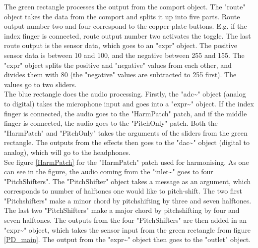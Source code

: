 The green rectangle processes the output from the comport object. The "route" object takes the data from the comport and splits it up into five parts. 
Route output number two and four correspond to the copper-plate buttons. E.g. if the index finger is connected, route output number two activates the toggle. 
The last route output is the sensor data, which goes to an "expr" object. The positive sensor data is between 10 and 100, and the negative between 255 and 155. 
The "expr" object splits the positive and "negative" values from each other, and divides them with 80 (the "negative" values are subtracted to 255 first). 
The values go to two sliders.\\

The blue rectangle does the audio processing. Firstly, the "adc\textasciitilde" object (analog to digital) takes the microphone input and goes into a "expr\textasciitilde" object. If the index finger is connected, 
the audio goes to the "HarmPatch" patch, and if the middle finger is connected, the audio goes to the "PitchOnly" patch. Both the "HarmPatch" and "PitchOnly" takes 
the arguments of the sliders from the green rectangle. The outputs from the effects then goes to the "dac\textasciitilde" object (digital to analog), which will go to the headphones.\\

See figure \ref{HarmPatch} for the "HarmPatch" patch used for harmonising. As one can see in the figure, the audio coming from the "inlet\textasciitilde" goes to four "PitchShifters". The "PitchShifter" object
takes a message as an argument, which corresponds to number of halftones one would like to pitch-shift. The two first "Pitchshifters" make a minor chord by pitchshifting by three and seven halftones.  The last two "PitchShifters" make a major chord by pitchshifting by four and seven halftones. The outputs from the four "PitchShifters" are then added in an "expr\textasciitilde" object, which takes the
sensor input from the green rectangle from figure \ref{PD_main}. The output from the "expr\textasciitilde" object then goes to the "outlet" object.
 
\begin{minipage}{\linewidth}%
\label{HarmPatch}
\end{minipage}\\

